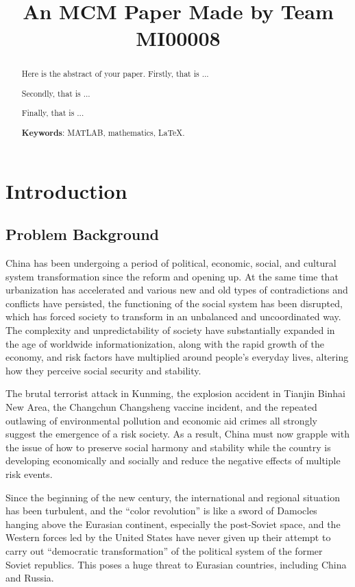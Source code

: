 \documentclass[12pt]{article}  %
\title{An MCM Paper Made by Team MI00008}  %
\begin{document}
\begin{abstract}
    Here is the abstract of your paper.
    Firstly, that is ...

    Secondly, that is ...

    Finally, that is ...

    \vspace{5pt}
    \textbf{Keywords}: MATLAB, mathematics, LaTeX.

\end{abstract}

\maketitle  %
\tableofcontents  %


\section{Introduction}
\subsection{Problem Background}
China has been undergoing a period of political, economic, social, and cultural system transformation since the reform and opening up. At the same time that urbanization has accelerated and various new and old types of contradictions and conflicts have persisted, the functioning of the social system has been disrupted, which has forced society to transform in an unbalanced and uncoordinated way. The complexity and unpredictability of society have substantially expanded in the age of worldwide informationization, along with the rapid growth of the economy, and risk factors have multiplied around people's everyday lives, altering how they perceive social security and stability. 

The brutal terrorist attack in Kunming, the explosion accident in Tianjin Binhai New Area, the Changchun Changsheng vaccine incident, and the repeated outlawing of environmental pollution and economic aid crimes all strongly suggest the emergence of a risk society. As a result, China must now grapple with the issue of how to preserve social harmony and stability while the country is developing economically and socially and reduce the negative effects of multiple risk events.

Since the beginning of the new century, the international and regional situation has been turbulent, and the ``color revolution'' is like a sword of Damocles hanging above the Eurasian continent, especially the post-Soviet space, and the Western forces led by the United States have never given up their attempt to carry out ``democratic transformation'' of the political system of the former Soviet republics. This poses a huge threat to Eurasian countries, including China and Russia.
\end{document}
